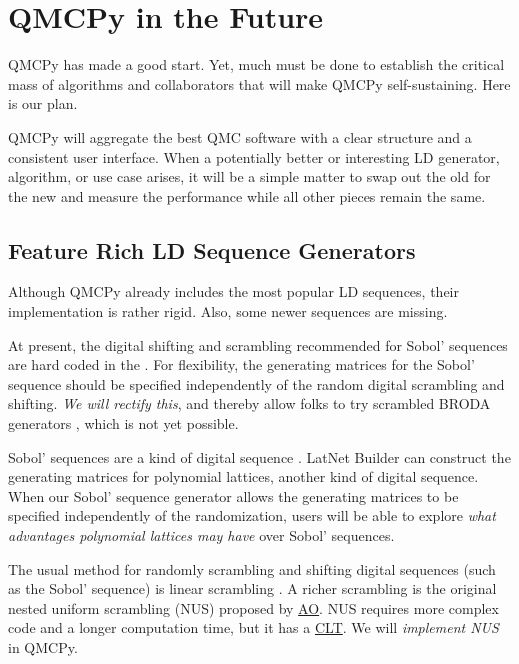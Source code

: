 \documentclass[11pt]{NSFamsart}
\newcommand{\AO}{\hyperlink{AOlink}{AO}\xspace}
\newcommand{\CLT}{\hyperlink{CLTlink}{CLT}\xspace}
\begin{document}
\section{QMCPy in the Future}
QMCPy has made a good start.  Yet, much must be done to establish the critical mass of algorithms and collaborators that will make QMCPy  self-sustaining.  Here is our plan.

QMCPy will aggregate the best QMC software with a clear structure and a consistent user interface.  When a potentially better or interesting LD generator, algorithm, or use case arises, it will be a simple matter to swap out the old for the new and measure the performance while all other pieces remain the same.

\subsection{Feature Rich LD Sequence Generators} \label{sec:richLD}
Although QMCPy already includes the most popular LD sequences, their implementation is rather rigid.  Also, some newer sequences are missing.

At present, the digital shifting and scrambling recommended for Sobol' sequences are hard coded in the  .  For flexibility, the generating matrices  for the Sobol' sequence should be specified independently of the random digital scrambling and shifting.  \emph{We will rectify this}, and thereby allow folks to try scrambled BRODA generators \cite{BRODA20a}, which is not yet possible.

Sobol' sequences are a kind of digital sequence \cite{DicPil10a}.  LatNet Builder \cite{LatNet} can construct the generating matrices for polynomial lattices,  another kind of digital sequence.  When our Sobol' sequence generator allows the  generating matrices to be specified independently of the randomization, users will be able to explore  \emph{what advantages polynomial lattices may have} over Sobol' sequences.

The usual method for randomly scrambling and shifting digital sequences (such as the Sobol' sequence) is linear scrambling \cite{Mat98,HonHic00a}.  A richer scrambling is the original nested uniform scrambling (NUS) proposed by \AO \cite{Owe95}.  NUS requires more complex code and a longer computation time, but it has a \CLT  \cite{Loh01}.  We will \emph{implement NUS} in QMCPy.
\end{document}
